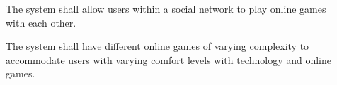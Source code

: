 \begin{description}
    \item[\textbf{\showfuncgamecounter}]
        The system shall allow users within a social network to play online
            games with each other.
    \item[\textbf{\showfuncgamecounter}]
        The system shall have different online games of varying complexity to
            accommodate users with varying comfort levels with technology and
            online games.
\end{description}
